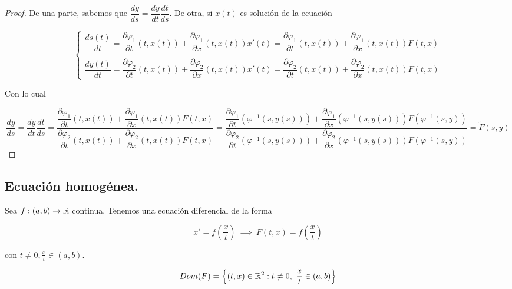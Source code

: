 \begin{proof}

  De una parte, sabemos que $\dfrac{dy}{ds} = \dfrac{dy}{dt}\dfrac{dt}{ds}$. De otra, si $x(t)$
  es solución de la ecuación

  
  \[
  \begin{cases}
    \dfrac{ds(t)}{dt} = \dfrac{\partial \varphi_1}{\partial t}(t, x(t)) + \dfrac{\partial \varphi_1}{\partial x}(t, x(t))x'(t) = \dfrac{\partial \varphi_1}{\partial t}(t, x(t)) + \dfrac{\partial \varphi_1}{\partial x}(t, x(t))F(t, x) \\ \\

 \dfrac{dy(t)}{dt} = \dfrac{\partial \varphi_2}{\partial t}(t, x(t)) + \dfrac{\partial \varphi_2}{\partial x}(t, x(t))x'(t) = \dfrac{\partial \varphi_2}{\partial t}(t, x(t)) + \dfrac{\partial \varphi_2}{\partial x}(t, x(t))F(t, x)
   
  \end{cases}
  \]

  Con lo cual

  \[
  \dfrac{dy}{ds} = \dfrac{dy}{dt}\dfrac{dt}{ds} = \dfrac{\dfrac{\partial \varphi_1}{\partial t}(t, x(t)) + \dfrac{\partial \varphi_1}{\partial x}(t, x(t))F(t, x)}{\dfrac{\partial \varphi_2}{\partial t}(t, x(t)) + \dfrac{\partial \varphi_2}{\partial x}(t, x(t))F(t, x)}
  = \dfrac{\dfrac{\partial \varphi_1}{\partial t}(\varphi^{-1}(s, y(s))) + \dfrac{\partial \varphi_1}{\partial x}(\varphi^{-1}(s, y(s)))F(\varphi^{-1}(s, y))}{\dfrac{\partial \varphi_2}{\partial t}(\varphi^{-1}(s, y(s))) + \dfrac{\partial \varphi_2}{\partial x}(\varphi^{-1}(s, y(s)))F(\varphi^{-1}(s, y))} = \tilde{F}(s,y)
  \]


\end{proof}

\subsection{Ecuación homogénea.}

Sea $f:(a,b) \to \mathbb{R}$ continua. Tenemos una ecuación diferencial de la forma

\[x' = f\left(\frac{x}{t}\right) \ \implies \ F\left(t,x\right) = f\left(\frac{x}{t}\right)\]

con $t \neq 0, \frac{x}{t} \in (a,b)$.

\[Dom(F) = \left\{(t,x)\in \mathbb{R} ^2 : t \neq 0, \ \frac{x}{t} \in (a,b)\right\}\]

